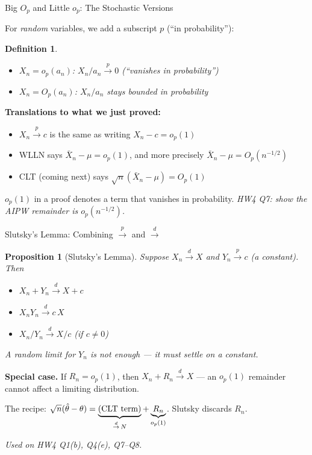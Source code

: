 \documentclass[handout, aspectratio=169]{beamer}
\newtheorem{prop}{Proposition}
\newtheorem{defn}{Definition}
\numberwithin{equation}{section}
\begin{document}
\begin{frame}{Big $O_p$ and Little $o_p$: The Stochastic Versions}

For \emph{random} variables, we add a subscript $p$ (``in probability''):

\begin{defn}
\begin{itemize}
  \item $X_n = o_p(a_n)$: \quad $X_n/a_n \overset{p}{\to} 0$ \quad (``vanishes in probability'')
  \item $X_n = O_p(a_n)$: \quad $X_n/a_n$ stays \emph{bounded in probability}
\end{itemize}
\end{defn}

\pause

\textbf{Translations to what we just proved:}
\begin{itemize}
  \item $X_n \overset{p}{\to} c$ is the same as writing $X_n - c = o_p(1)$
  \item WLLN says $\bar{X}_n - \mu = o_p(1)$, and more precisely $\bar{X}_n - \mu = O_p(n^{-1/2})$
  \item CLT (coming next) says $\sqrt{n}(\bar{X}_n - \mu) = O_p(1)$
\end{itemize}

\pause

$o_p(1)$ in a proof denotes a term that vanishes in probability. \textit{HW4 Q7: show the AIPW remainder is $o_p(n^{-1/2})$.}

\end{frame}


\begin{frame}{Slutsky's Lemma: Combining $\overset{p}{\to}$ and $\overset{d}{\to}$}

\begin{prop}[Slutsky's Lemma]
Suppose $X_n \overset{d}{\to} X$ and $Y_n \overset{p}{\to} c$ (a constant). Then
\begin{itemize}\setlength\itemsep{1pt}
\item $X_n + Y_n \overset{d}{\to} X + c$
\item $X_n Y_n \overset{d}{\to} c\,X$
\item $X_n / Y_n \overset{d}{\to} X/c$ \quad (if $c\neq 0$)
\end{itemize}
A random limit for $Y_n$ is \emph{not} enough --- it must settle on a constant.
\end{prop}

\textbf{Special case.} If $R_n = o_p(1)$, then $X_n + R_n \overset{d}{\to} X$ --- an $o_p(1)$ remainder cannot affect a limiting distribution.

The recipe: $\sqrt{n}(\hat\theta - \theta) = \underbrace{\textnormal{(CLT term)}}_{\overset{d}{\to}\,N} + \underbrace{R_n}_{o_p(1)}$. Slutsky discards $R_n$.

\textit{Used on HW4 Q1(b), Q4(e), Q7--Q8.}

\end{frame}
\end{document}
